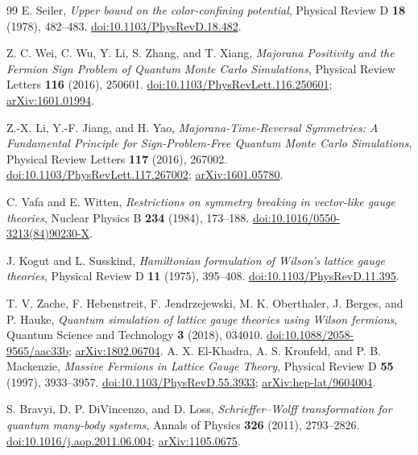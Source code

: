 \begin{thebibliography}{99}
E. Seiler, \emph{Upper bound on the color-confining potential},
Physical Review D \textbf{18} (1978), 482--483.
\href{https://doi.org/10.1103/PhysRevD.18.482}{doi:10.1103/PhysRevD.18.482}.

Z. C. Wei, C. Wu, Y. Li, S. Zhang, and T. Xiang,
\emph{Majorana Positivity and the Fermion Sign Problem of Quantum Monte Carlo Simulations},
Physical Review Letters \textbf{116} (2016), 250601.
\href{https://doi.org/10.1103/PhysRevLett.116.250601}{doi:10.1103/PhysRevLett.116.250601};
\href{https://arxiv.org/abs/1601.01994}{arXiv:1601.01994}.

Z.-X. Li, Y.-F. Jiang, and H. Yao,
\emph{Majorana-Time-Reversal Symmetries: A Fundamental Principle for
Sign-Problem-Free Quantum Monte Carlo Simulations},
Physical Review Letters \textbf{117} (2016), 267002.
\href{https://doi.org/10.1103/PhysRevLett.117.267002}{doi:10.1103/PhysRevLett.117.267002};
\href{https://arxiv.org/abs/1601.05780}{arXiv:1601.05780}.

C. Vafa and E. Witten,
\emph{Restrictions on symmetry breaking in vector-like gauge theories},
Nuclear Physics B \textbf{234} (1984), 173--188.
\href{https://doi.org/10.1016/0550-3213(84)90230-X}{doi:10.1016/0550-3213(84)90230-X}.

J. Kogut and L. Susskind,
\emph{Hamiltonian formulation of Wilson's lattice gauge theories},
Physical Review D \textbf{11} (1975), 395--408.
\href{https://doi.org/10.1103/PhysRevD.11.395}{doi:10.1103/PhysRevD.11.395}.

T. V. Zache, F. Hebenstreit, F. Jendrzejewski, M. K. Oberthaler,
J. Berges, and P. Hauke,
\emph{Quantum simulation of lattice gauge theories using Wilson fermions},
Quantum Science and Technology \textbf{3} (2018), 034010.
\href{https://doi.org/10.1088/2058-9565/aac33b}{doi:10.1088/2058-9565/aac33b};
\href{https://arxiv.org/abs/1802.06704}{arXiv:1802.06704}.
A. X. El-Khadra, A. S. Kronfeld, and P. B. Mackenzie,
\emph{Massive Fermions in Lattice Gauge Theory},
Physical Review D \textbf{55} (1997), 3933--3957.
\href{https://doi.org/10.1103/PhysRevD.55.3933}{doi:10.1103/PhysRevD.55.3933};
\href{https://arxiv.org/abs/hep-lat/9604004}{arXiv:hep-lat/9604004}.

S. Bravyi, D. P. DiVincenzo, and D. Loss,
\emph{Schrieffer--Wolff transformation for quantum many-body systems},
Annals of Physics \textbf{326} (2011), 2793--2826.
\href{https://doi.org/10.1016/j.aop.2011.06.004}{doi:10.1016/j.aop.2011.06.004};
\href{https://arxiv.org/abs/1105.0675}{arXiv:1105.0675}.


\end{thebibliography}
